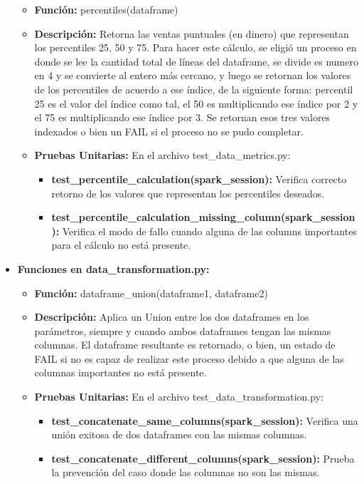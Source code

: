 \documentclass[a4paper]{article}
\begin{document}
\begin{itemize}
        \begin{itemize}
            \item \textbf{Funci\'{o}n:} percentiles(dataframe)
            \item \textbf{Descripci\'{o}n:} Retorna las ventas puntuales (en dinero) que representan los percentiles 25, 50 y 75. Para hacer este c\'{a}lculo, se eligi\'{o} un proceso en donde se lee la cantidad total de l\'{i}neas del dataframe, se divide es numero en 4 y se convierte al entero m\'{a}s cercano, y luego se retornan los valores de los percentiles de acuerdo a ese \'{i}ndice, de la siguiente forma: percentil 25 es el valor del \'{i}ndice como tal, el 50 es multiplicando ese \'{i}ndice por 2 y el 75 es multiplicando ese \'{i}ndice por 3. Se retornan esos tres valores indexados o bien un FAIL si el proceso no se pudo completar.
            \item \textbf{Pruebas Unitarias:} En el archivo test\_data\_metrics.py:
                \begin{itemize}
                    \item \textbf{test\_percentile\_calculation(spark\_session):} Verifica correcto retorno de los valores que representan los percentiles deseados.
                    \item \textbf{test\_percentile\_calculation\_missing\_column(spark\_session):} Verifica el modo de fallo cuando alguna de las columns importantes para el c\'{a}lculo no est\'{a} presente.
                \end{itemize}
        \end{itemize}

    \item \textbf{Funciones en data\_transformation.py:}
        \begin{itemize}
            \item \textbf{Funci\'{o}n:} dataframe\_union(dataframe1, dataframe2)
            \item \textbf{Descripci\'{o}n:} Aplica un Union entre los dos dataframes en los par\'{a}metros, siempre y cuando ambos dataframes tengan las mismas columnas. El dataframe resultante es retornado, o bien, un estado de FAIL si no es capaz de realizar este proceso debido a que alguna de las columnas importantes no est\'{a} presente.
            \item \textbf{Pruebas Unitarias:} En el archivo test\_data\_transformation.py:
                \begin{itemize}
                    \item \textbf{test\_concatenate\_same\_columns(spark\_session):} Verifica una uni\'{o}n exitosa de dos dataframes con las mismas columnas.
                    \item \textbf{test\_concatenate\_different\_columns(spark\_session):} Prueba la prevenci\'{o}n del caso donde las columnas no son las mismas.
                \end{itemize}
        \end{itemize}


\end{itemize}
\end{document}
